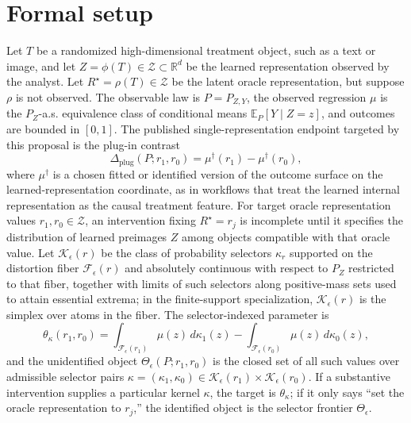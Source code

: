 \documentclass[11pt]{article}
\newcommand{\E}{\mathbb{E}}
\theoremstyle{definition}
\theoremstyle{plain}
\theoremstyle{remark}
\begin{document}
\section{Formal setup}
Let \(T\) be a randomized high-dimensional treatment object, such as a text or image, and let \(Z=\phi(T)\in\mathcal Z\subset\mathbb R^d\) be the learned representation observed by the analyst.  Let \(R^\star=\rho(T)\in\mathcal Z\) be the latent oracle representation, but suppose \(\rho\) is not observed.  The observable law is \(P=P_{Z,Y}\), the observed regression \(\mu\) is the \(P_Z\)-a.s. equivalence class of conditional means \(\E_P[Y\mid Z=z]\), and outcomes are bounded in \([0,1]\).  The published single-representation endpoint targeted by this proposal is the plug-in contrast
\[
\Delta_{\mathrm{plug}}(P;r_1,r_0)=\mu^\dagger(r_1)-\mu^\dagger(r_0),
\]
where \(\mu^\dagger\) is a chosen fitted or identified version of the outcome surface on the learned-representation coordinate, as in workflows that treat the learned internal representation as the causal treatment feature.  For target oracle representation values \(r_1,r_0\in\mathcal Z\), an intervention fixing \(R^\star=r_j\) is incomplete until it specifies the distribution of learned preimages \(Z\) among objects compatible with that oracle value.  Let \(\mathcal K_\epsilon(r)\) be the class of probability selectors \(\kappa_r\) supported on the distortion fiber \(\mathcal F_\epsilon(r)\) and absolutely continuous with respect to \(P_Z\) restricted to that fiber, together with limits of such selectors along positive-mass sets used to attain essential extrema; in the finite-support specialization, \(\mathcal K_\epsilon(r)\) is the simplex over atoms in the fiber.  The selector-indexed parameter is
\[
\theta_{\kappa}(r_1,r_0)
=
\int_{\mathcal F_\epsilon(r_1)}\mu(z)\,d\kappa_1(z)
-
\int_{\mathcal F_\epsilon(r_0)}\mu(z)\,d\kappa_0(z),
\]
and the unidentified object \(\Theta_\epsilon(P;r_1,r_0)\) is the closed set of all such values over admissible selector pairs \(\kappa=(\kappa_1,\kappa_0)\in\mathcal K_\epsilon(r_1)\times\mathcal K_\epsilon(r_0)\).  If a substantive intervention supplies a particular kernel \(\kappa\), the target is \(\theta_\kappa\); if it only says ``set the oracle representation to \(r_j\),'' the identified object is the selector frontier \(\Theta_\epsilon\).
\end{document}
